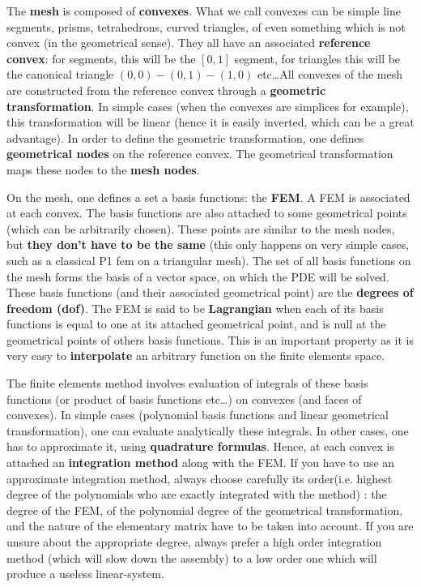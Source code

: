 \documentclass[11pt,a4paper]{article}
\begin{document}
The \textbf{mesh} is composed of
\textbf{convexes}. What we call convexes can be simple
line segments, prisms, tetrahedrons, curved triangles, of even
something which is not convex (in the geometrical sense). They all
have an associated \textbf{reference convex}:
for segments, this will be the $[0,1]$ segment, for triangles this
will be the canonical triangle $(0,0)-(0,1)-(1,0)$ etc\ldots All convexes
of the mesh are constructed from the reference convex through a
\textbf{geometric transformation}. In
simple cases (when the convexes are simplices for example), this
transformation will be linear (hence it is easily inverted, which can
be a great advantage). In order to define the geometric
transformation, one defines \textbf{geometrical
  nodes} on the reference convex. The
geometrical transformation maps these nodes to the \textbf{mesh
  nodes}.

On the mesh, one defines a set a basis functions: the
\textbf{FEM}. A FEM is associated at each convex. The basis
functions are also attached to some geometrical points (which can be
arbitrarily chosen). These points are similar to the mesh nodes, but
\textbf{they don't have to be the same} (this only happens on very
simple cases, such as a classical P1 fem on a triangular mesh). The
set of all basis functions on the mesh forms the basis of a vector
space, on which the PDE will be solved. These basis functions (and
their associated geometrical point) are the \textbf{degrees of freedom
  (dof)}. The FEM is said to be
\textbf{Lagrangian} when each of its basis functions
is equal to one at its attached geometrical point, and is null at the
geometrical points of others basis functions. This is an important
property as it is very easy to
\textbf{interpolate} an arbitrary function on the
finite elements space.

The finite elements method involves evaluation of integrals of these
basis functions (or product of basis functions etc\ldots) on convexes (and
faces of convexes). In simple cases (polynomial basis functions and
linear geometrical transformation), one can evaluate analytically
these integrals. In other cases, one has to approximate it, using
\textbf{quadrature formulas}. Hence, at
each convex is attached an \textbf{integration
  method} along with the FEM.  If you have
to use an approximate integration method, always choose carefully its
order(i.e. highest degree of the polynomials who are exactly
integrated with the method) : the degree of the FEM, of the polynomial
degree of the geometrical transformation, and the nature of the
elementary matrix have to be taken into account. If you are unsure
about the appropriate degree, always prefer a high order integration
method (which will slow down the assembly) to a low order one which
will produce a useless linear-system.
\end{document}
